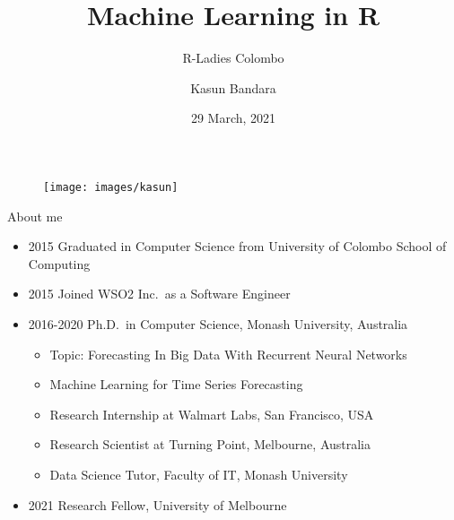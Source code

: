 \documentclass[12pt,ignorenonframetext,]{beamer}
\title[]{Machine Learning in R}
\subtitle{R-Ladies Colombo}
\author[
        Kasun Bandara
    ]{Kasun Bandara}
\institute[
    ]{
    Melbourne Centre for Data Science, University of Melbourne, Australia.
    }
\date[
      29 March, 2021
  ]{
      29 March, 2021
        }
\providecommand{\tightlist}{%
  \setlength{\itemsep}{0pt}\setlength{\parskip}{0pt}}
\begin{document}
  \begin{frame}[plain]
  \titlepage
  \end{frame}



\begin{frame}

\begin{figure}
\texttt{[image: images/kasun]}
\end{figure}

\end{frame}

\begin{frame}{About me}
\protect\hypertarget{about-me}{}

\begin{itemize}
\tightlist
\item
  2015 Graduated in Computer Science from University of Colombo School
  of Computing
\item
  2015 Joined WSO2 Inc.~as a Software Engineer
\item
  2016-2020 Ph.D.~in Computer Science, Monash University, Australia

  \begin{itemize}
  \tightlist
  \item
    Topic: Forecasting In Big Data With Recurrent Neural Networks
  \item
    Machine Learning for Time Series Forecasting
  \item
    Research Internship at Walmart Labs, San Francisco, USA
  \item
    Research Scientist at Turning Point, Melbourne, Australia
  \item
    Data Science Tutor, Faculty of IT, Monash University
  \end{itemize}
\item
  2021 Research Fellow, University of Melbourne
\end{itemize}

\end{frame}
\end{document}
